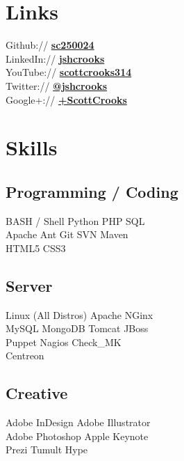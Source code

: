 \documentclass[a4paper]{deedy-resume-proximanova-sanfran} %
\begin{document}
\begin{minipage}[t]{0.33\textwidth}
\section{Links} 

Github:// \href{https://github.com/sc250024}{\bf sc250024} \\
LinkedIn:// \href{https://www.linkedin.com/in/jshcrooks}{\bf jshcrooks} \\
YouTube:// \href{https://www.youtube.com/user/scottcrooks314}{\bf scottcrooks314} \\
Twitter:// \href{https://twitter.com/jshcrooks}{\bf @jshcrooks} \\
Google+:// \href{https://www.google.com/+ScottCrooks}{\bf +ScottCrooks}

\sectionspace %


\section{Skills}

\subsection{Programming / Coding}

BASH / Shell \textbullet{} Python \textbullet{} PHP \textbullet{} SQL \\
Apache Ant \textbullet{} Git \textbullet{} SVN \textbullet{} Maven \\
HTML5 \textbullet{} CSS3

\sectionspace %

\subsection{Server}
Linux (All Distros) \textbullet{} Apache \textbullet{} NGinx \\
MySQL \textbullet{} MongoDB \textbullet{} Tomcat \textbullet{} JBoss \\
Puppet \textbullet{} Nagios \textbullet{} Check\_MK \\ 
Centreon \\

\sectionspace %

\subsection{Creative}
Adobe InDesign \textbullet{} Adobe Illustrator \\
Adobe Photoshop \textbullet{} Apple Keynote \\ 
Prezi \textbullet{} Tumult Hype


\end{minipage}
\end{document}
